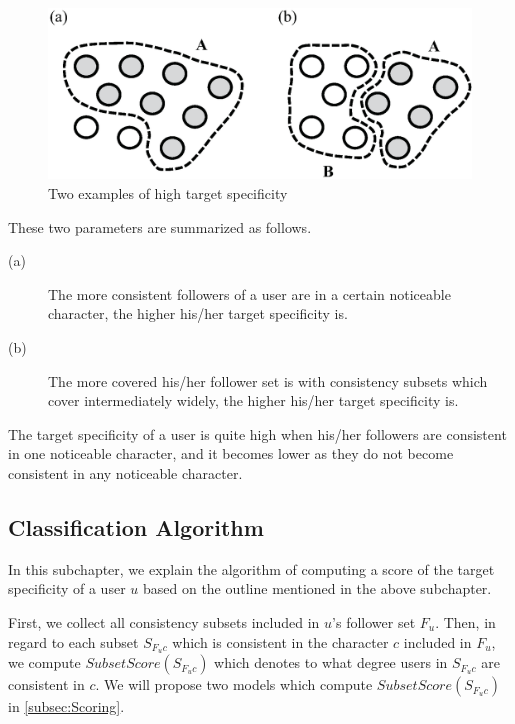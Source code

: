 {\footnotesize
\begin{figure}[t]
\begin{center}
\includegraphics[width=14cm]{images/high_consistency.eps}
 \caption{Two examples of high target specificity}
\label{fig:High Consistency}
\end{center}
\end{figure}
}

These two parameters are summarized as follows.

\begin{description}
\item[(a)] The more consistent followers of a user are in a certain
           noticeable character, the higher his/her target specificity
           is.
\item[(b)] The more covered his/her follower set is with consistency
           subsets which cover intermediately widely, the higher his/her
           target specificity is.
\end{description}

The target specificity of a user is quite high when his/her followers
are consistent in one noticeable character, and it becomes lower as they
do not become consistent in any noticeable character.

\subsection{Classification Algorithm}
\label{subsec:Algorithm}

In this subchapter, we explain the algorithm of computing a score of the
target specificity of a user $u$ based on the outline mentioned in the
above subchapter.

First, we collect all consistency subsets included in $u$'s follower set
$F_u$.  Then, in regard to each subset $S_{F_uc}$ which is consistent in
the character $c$ included in $F_u$, we compute
$\mathit{SubsetScore}(S_{F_uc})$ which denotes to what degree users in
$S_{F_uc}$ are consistent in $c$. We will propose two models which
compute $\mathit{SubsetScore}(S_{F_uc})$ in \ref{subsec:Scoring}.

